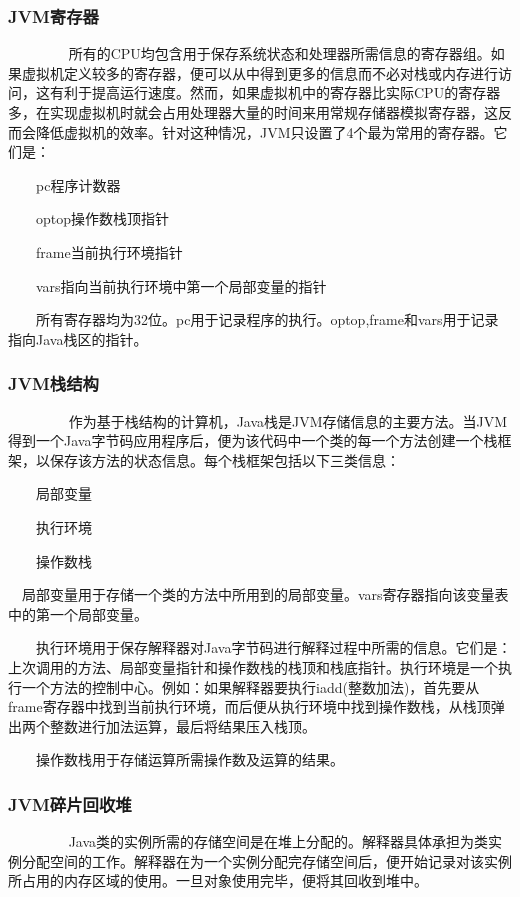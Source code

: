 \documentclass[10pt,b5paper]{article}
\begin{document}
\subsubsection{JVM寄存器}
\label{sec-1-2-2}
　　 
　　所有的CPU均包含用于保存系统状态和处理器所需信息的寄存器组。如果虚拟机定义较多的寄存器，便可以从中得到更多的信息而不必对栈或内存进行访问，这有利于提高运行速度。然而，如果虚拟机中的寄存器比实际CPU的寄存器多，在实现虚拟机时就会占用处理器大量的时间来用常规存储器模拟寄存器，这反而会降低虚拟机的效率。针对这种情况，JVM只设置了4个最为常用的寄存器。它们是： 

　　pc程序计数器 

　　optop操作数栈顶指针 

　　frame当前执行环境指针 

　　vars指向当前执行环境中第一个局部变量的指针 

　　所有寄存器均为32位。pc用于记录程序的执行。optop,frame和vars用于记录指向Java栈区的指针。 
　　 

\subsubsection{JVM栈结构}
\label{sec-1-2-3}
　　 
　　作为基于栈结构的计算机，Java栈是JVM存储信息的主要方法。当JVM得到一个Java字节码应用程序后，便为该代码中一个类的每一个方法创建一个栈框架，以保存该方法的状态信息。每个栈框架包括以下三类信息： 

　　局部变量 

　　执行环境 

　　操作数栈    

　局部变量用于存储一个类的方法中所用到的局部变量。vars寄存器指向该变量表中的第一个局部变量。 

　　执行环境用于保存解释器对Java字节码进行解释过程中所需的信息。它们是：上次调用的方法、局部变量指针和操作数栈的栈顶和栈底指针。执行环境是一个执行一个方法的控制中心。例如：如果解释器要执行iadd(整数加法)，首先要从frame寄存器中找到当前执行环境，而后便从执行环境中找到操作数栈，从栈顶弹出两个整数进行加法运算，最后将结果压入栈顶。 

　　操作数栈用于存储运算所需操作数及运算的结果。 
　　 

\subsubsection{JVM碎片回收堆}
\label{sec-1-2-4}
　　 
　　Java类的实例所需的存储空间是在堆上分配的。解释器具体承担为类实例分配空间的工作。解释器在为一个实例分配完存储空间后，便开始记录对该实例所占用的内存区域的使用。一旦对象使用完毕，便将其回收到堆中。 
\end{document}
